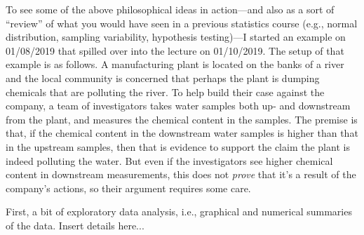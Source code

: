 \documentclass[a4paper, 12pt]{article}
\theoremstyle{plain}
\theoremstyle{definition}
\theoremstyle{remark}
\begin{document}
To see some of the above philosophical ideas in action---and also as a sort of ``review'' of what you would have seen in a previous statistics course (e.g., normal distribution, sampling variability, hypothesis testing)---I started an example on 01/08/2019 that spilled over into the lecture on 01/10/2019.  The setup of that example is as follows.  A manufacturing plant is located on the banks of a river and the local community is concerned that perhaps the plant is dumping chemicals that are polluting the river.  To help build their case against the company, a team of investigators takes water samples both up- and downstream from the plant, and measures the chemical content in the samples.  The premise is that, if the chemical content in the downstream water samples is higher than that in the upstream samples, then that is evidence to support the claim the plant is indeed polluting the water.  But even if the investigators see higher chemical content in downstream measurements, this does not {\em prove} that it's a result of the company's actions, so their argument requires some care.  

First, a bit of exploratory data analysis, i.e., graphical and numerical summaries of the data.  {\color{red} Insert details here...}
\end{document}
